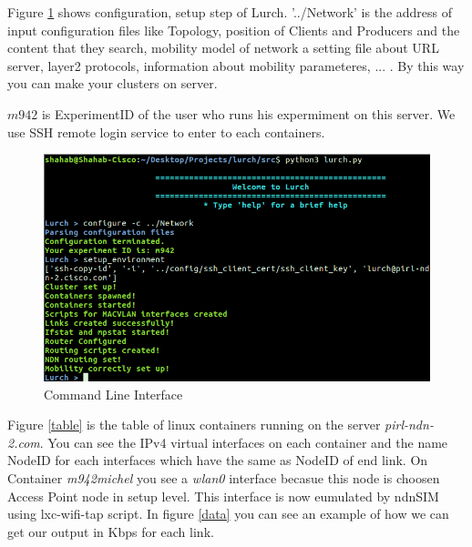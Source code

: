 Figure \ref{cli} shows configuration, setup step of Lurch.
'../Network' is the address of input configuration files like Topology, position of Clients and Producers and the content that they search, mobility model of network a setting file about URL server, layer2 protocols, information about mobility parameteres, ... . By this way you can make your clusters on server.

$m942$ is ExperimentID of the user who runs his expermiment on this server. We use SSH remote login service to enter to each containers.

\begin{figure}[H]

\begin{center}

\includegraphics[scale = 0.35]{Pictures/lurch.png}

\caption{Command Line Interface} \label{cli} 

\end{center}

\end{figure}

 
Figure \ref{table} is the table of linux containers running on the server \textit{pirl-ndn-2.com}. You can see the IPv4 virtual interfaces on each container and the name NodeID for each interfaces which have the same as NodeID of end link. On Container \textit{m942michel} you see a \textit{wlan0} interface becasue this node is choosen Access Point node in setup level. This interface is now eumulated by ndnSIM using lxc-wifi-tap script. In figure \ref{data} you can see an example of how we can get our output in Kbps for each link.



